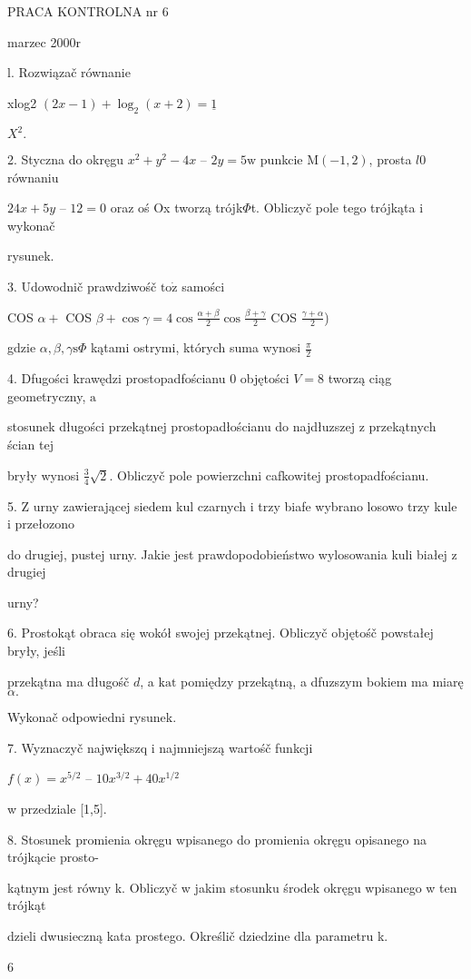 \documentclass[a4paper,12pt]{article}
\begin{document}
PRACA KONTROLNA nr 6

marzec 2000r

l. Rozwiązač równanie

xlog2 $(2x-1)+\log_{2}(x+2) =\underline{1}$

$X^{2}.$

2. Styczna do okręgu $x^{2}+y^{2}-4x$ -- $2y = 5\mathrm{w}$ punkcie $\mathrm{M}(-1,2)$, prosta $l0$ równaniu

$24x+5y$ -- $12 =0$ oraz oś Ox tworzą trójk$\Phi$t. Obliczyč pole tego trójkąta $\mathrm{i}$ wykonač

rysunek.

3. Udowodnič prawdziwośč $\mathrm{t}\mathrm{o}\dot{\mathrm{z}}$ samości

COS $\alpha+$ COS $\displaystyle \beta+\cos\gamma=4\cos\frac{\alpha+\beta}{2}\cos\frac{\beta+\gamma}{2}$ COS $\displaystyle \frac{\gamma+\alpha}{2}$)

gdzie $\alpha, \beta, \gamma \mathrm{s}\Phi$ kątami ostrymi, których suma wynosi $\displaystyle \frac{\pi}{2}$

4. Dfugości krawędzi prostopadfościanu $0$ objętości $V = 8$ tworzą ciąg geometryczny, $\mathrm{a}$

stosunek długości przekątnej prostopadłościanu do najdłuzszej $\mathrm{z}$ przekątnych ścian tej

bryły wynosi $\displaystyle \frac{3}{4}\sqrt{2}$. Obliczyč pole powierzchni cafkowitej prostopadfościanu.

5. $\mathrm{Z}$ urny zawierającej siedem kul czarnych $\mathrm{i}$ trzy biafe wybrano losowo trzy kule $\mathrm{i}$ przełozono

do drugiej, pustej urny. Jakie jest prawdopodobieństwo wylosowania kuli białej $\mathrm{z}$ drugiej

urny?

6. Prostokąt obraca się wokół swojej przekątnej. Obliczyč objętośč powstałej bryły, jeśli

przekątna ma długośč $d$, a $\mathrm{k}\mathrm{a}\mathrm{t}$ pomiędzy przekątną, a dfuzszym bokiem ma miarę $\alpha.$

Wykonač odpowiedni rysunek.

7. Wyznaczyč największq $\mathrm{i}$ najmniejszą wartośč funkcji

$f(x) =x^{5/2}$ -- $10x^{3/2}+40x^{1/2}$

w przedziale [1,5].

8. Stosunek promienia okręgu wpisanego do promienia okręgu opisanego na trójkącie prosto-

kątnym jest równy k. Obliczyč w jakim stosunku środek okręgu wpisanego w ten trójkąt

dzieli dwusieczną kata prostego. Określič dziedzine dla parametru k.

6
\end{document}
